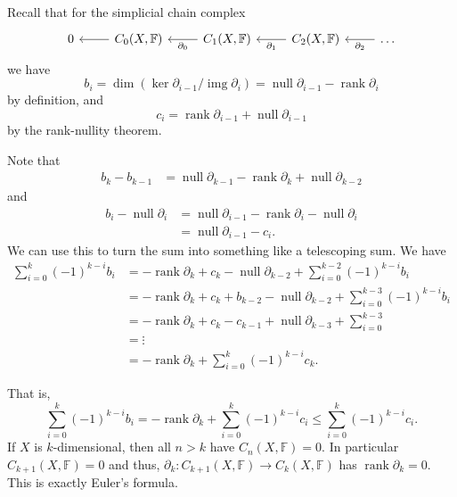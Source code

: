\documentclass[12 pt, letterpaper]{hmcpset}
\begin{document}
\begin{solution}
	Recall that for the simplicial chain complex
	\[
	\begin{tikzcd}
		0 & {C}_{0}(X, \mathbb{F}) \ar[l] & {C}_{1}(X, \mathbb{F}) \ar[l, "\partial_{0}"] & {C}_{2}(X, \mathbb{F}) \ar[l, "\partial_{1}"] & \dots \ar[l, "\partial_{2}"]
	\end{tikzcd}
	\]
	we have
	\[
		b_{i} = \dim (\ker \partial_{i - 1} / \operatorname{img} \partial_{i}) = \operatorname{null} \partial_{i - 1} - \operatorname{rank} \partial_{i}
	\]
	by definition, and
	\[
		c_{i} = \operatorname{rank} \partial_{i - 1} + \operatorname{null} \partial_{i - 1}
	\]
	by the rank-nullity theorem.

	Note that
	\begin{align*}
		b_{k} - b_{k - 1} & = \operatorname{null} \partial_{k - 1} - \operatorname{rank} \partial_{k} + \operatorname{null} \partial_{k - 2}
	\end{align*}
	and
	\begin{align*}
		b_{i} - \operatorname{null} \partial_{i} & = \operatorname{null} \partial_{i - 1} - \operatorname{rank} \partial_{i} - \operatorname{null} \partial_{i} \\
							 & = \operatorname{null} \partial_{i - 1} - c_{i}.
	\end{align*}
	We can use this to turn the sum into something like a telescoping sum. We have
	\begin{align*}
		\sum_{i = 0}^{k} (-1)^{k - i} b_{i} & = - \operatorname{rank} \partial_{k} + c_{k}  - \operatorname{null} \partial_{k - 2} + \sum_{i = 0}^{k - 2} (-1)^{k - i} b_{i} \\
						& = - \operatorname{rank} \partial_{k} + c_{k} + b_{k - 2} - \operatorname{null} \partial_{k - 2} + \sum_{i = 0}^{k - 3} (-1)^{k - i} b_{i} \\
						& = -\operatorname{rank} \partial_{k} + c_{k} - c_{k - 1} + \operatorname{null} \partial_{k - 3} + \sum_{i = 0}^{k - 3} \\
						& = \vdots \\
						& = -\operatorname{rank} \partial_{k} + \sum_{i = 0}^{k} (-1)^{k - i} c_{k}.
	\end{align*}

	That is,
	\[
		\sum_{i = 0}^{k} (-1)^{k - i} b_{i} = - \operatorname{rank} \partial_{k} + \sum_{i = 0}^{k} (-1)^{k - i} c_{i} \le \sum_{i = 0}^{k} (-1)^{k - i} c_{i}.
	\]
	If $X$ is $k$-dimensional, then all $n > k$ have $C_{n}(X, \mathbb{F}) = 0$. In particular $C_{k + 1}(X, \mathbb{F}) = 0$ and thus, $\partial_{k} : C_{k + 1}(X, \mathbb{F}) \to C_{k}(X, \mathbb{F})$ has $\operatorname{rank} \partial_{k} = 0$. This is exactly Euler's formula.
\end{solution}
\end{document}
